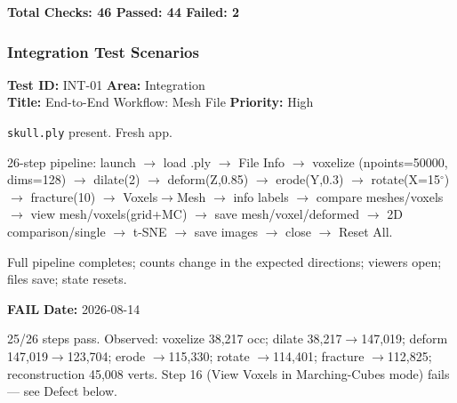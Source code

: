 \documentclass[12pt,a4paper]{article}
\newcommand{\fail}{\textcolor{paleored}{\textbf{FAIL}}}
\newcommand{\testheader}[4]{%
  \smallskip
  \noindent\textbf{Test ID:} #1 \hfill \textbf{Area:} #2 \\
  \textbf{Title:} #3 \hfill \textbf{Priority:} #4
}
\newenvironment{testbody}{%
  \begin{description}[leftmargin=2em,style=nextline]
}{%
  \end{description}
  \smallskip
}
\begin{document}
\begin{center}
\large\textbf{Total Checks: 46 \hspace{1em} Passed: 44 \hspace{1em} Failed: 2}
\end{center}

\newpage

\subsubsection{Integration Test Scenarios}

\testheader{INT-01}{Integration}{End-to-End Workflow: Mesh File}{High}
\begin{testbody}
  \item[\textbf{Preconditions:}] \texttt{skull.ply} present. Fresh app.
  \item[\textbf{Steps:}] 26-step pipeline: launch $\rightarrow$ load .ply
        $\rightarrow$ File Info $\rightarrow$ voxelize (npoints=50000, dims=128)
        $\rightarrow$ dilate(2) $\rightarrow$ deform(Z,0.85) $\rightarrow$
        erode(Y,0.3) $\rightarrow$ rotate(X=15$^\circ$) $\rightarrow$
        fracture(10) $\rightarrow$ Voxels$\rightarrow$Mesh $\rightarrow$ info
        labels $\rightarrow$ compare meshes/voxels $\rightarrow$ view
        mesh/voxels(grid+MC) $\rightarrow$ save mesh/voxel/deformed
        $\rightarrow$ 2D comparison/single $\rightarrow$ t-SNE $\rightarrow$ save
        images $\rightarrow$ close $\rightarrow$ Reset All.
  \item[\textbf{Expected Result:}] Full pipeline completes; counts change in
        the expected directions; viewers open; files save; state resets.
  \item[\textbf{Status:}] \fail{} \hspace{1em} \textbf{Date:} 2026-08-14
  \item[\textbf{Notes:}] 25/26 steps pass. Observed: voxelize 38,217 occ;
        dilate 38,217$\rightarrow$147,019; deform
        147,019$\rightarrow$123,704; erode $\rightarrow$115,330; rotate
        $\rightarrow$114,401; fracture $\rightarrow$112,825; reconstruction
        45,008 verts. Step 16 (View Voxels in Marching-Cubes mode) fails --- see
        Defect below.
\end{testbody}
\end{document}
